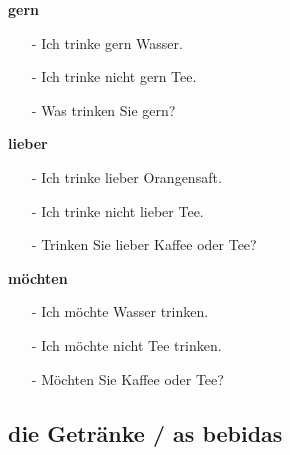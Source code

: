             \begin{multicols}{3}
                \textbf{gern}
                \begin{itemize}[topsep=0pt,itemsep=4pt,parsep=0pt]
                    \item[-] \textsb{[+]} Ich trinke gern Wasser.
                    \item[-] \textsb{[-]} Ich trinke nicht gern Tee.
                    \item[-] \textsb{[?]} Was trinken Sie gern? 
                \end{itemize}
            \vfill\null
            \columnbreak
                \textbf{lieber}
                \begin{itemize}[topsep=0pt,itemsep=4pt,parsep=0pt]
                    \item[-] \textsb{[+]} Ich trinke lieber Orangensaft.
                    \item[-] \textsb{[-]} Ich trinke nicht lieber Tee.
                    \item[-] \textsb{[?]} Trinken Sie lieber Kaffee oder Tee? 
                \end{itemize}
            \vfill\null
            \columnbreak
                \textbf{möchten}
                \begin{itemize}[topsep=0pt,itemsep=4pt,parsep=0pt]
                    \item[-] \textsb{[+]} Ich möchte Wasser trinken.
                    \item[-] \textsb{[-]} Ich möchte nicht Tee trinken.
                    \item[-] \textsb{[?]} Möchten Sie Kaffee oder Tee? 
                \end{itemize}
            \vfill\null
            \end{multicols}

        \subsection{die Getränke / as bebidas}\label{subsection:deutsch:im_cafe:die_getranke}

